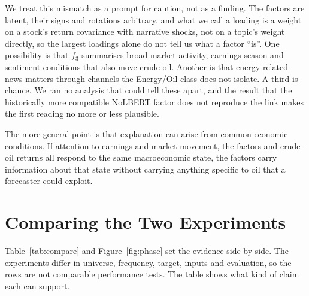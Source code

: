 \documentclass[11pt]{article}
\begin{document}
We treat this mismatch as a prompt for caution, not as a finding. The factors are latent, their signs and rotations arbitrary, and what we call a loading is a weight on a stock's return covariance with narrative shocks, not on a topic's weight directly, so the largest loadings alone do not tell us what a factor ``is''. One possibility is that $f_3$ summarises broad market activity, earnings-season and sentiment conditions that also move crude oil. Another is that energy-related news matters through channels the Energy/Oil class does not isolate. A third is chance. We ran no analysis that could tell these apart, and the result that the historically more compatible NoLBERT factor does not reproduce the link makes the first reading no more or less plausible.

The more general point is that explanation can arise from common economic conditions. If attention to earnings and market movement, the factors and crude-oil returns all respond to the same macroeconomic state, the factors carry information about that state without carrying anything specific to oil that a forecaster could exploit.

\section{Comparing the Two Experiments}
\label{sec:compare}

Table~\ref{tab:compare} and Figure~\ref{fig:phase} set the evidence side by side. The experiments differ in universe, frequency, target, inputs and evaluation, so the rows are not comparable performance tests. The table shows what kind of claim each can support.
\end{document}
